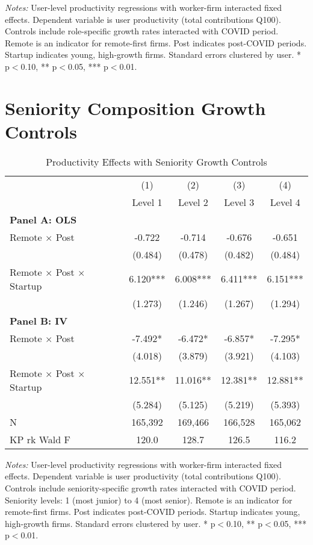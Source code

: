 \documentclass[11pt]{article}
\begin{document}
\noindent \footnotesize \textit{Notes:} User-level productivity regressions with worker-firm interacted fixed effects. Dependent variable is user productivity (total contributions Q100). Controls include role-specific growth rates interacted with COVID period. Remote is an indicator for remote-first firms. Post indicates post-COVID periods. Startup indicates young, high-growth firms. Standard errors clustered by user. * p$<$0.10, ** p$<$0.05, *** p$<$0.01.

\section{Seniority Composition Growth Controls}

\begin{table}[H]
\centering
\caption{Productivity Effects with Seniority Growth Controls}
\begin{tabular}{lcccc}
\toprule
 & (1) & (2) & (3) & (4) \\
 & Level 1 & Level 2 & Level 3 & Level 4 \\
\midrule
\multicolumn{5}{l}{\textbf{Panel A: OLS}} \\
\addlinespace
Remote $\times$ Post & -0.722 & -0.714 & -0.676 & -0.651 \\ & (0.484) & (0.478) & (0.482) & (0.484) \\
\addlinespace[0.5em]
Remote $\times$ Post $\times$ Startup & 6.120*** & 6.008*** & 6.411*** & 6.151*** \\ & (1.273) & (1.246) & (1.267) & (1.294) \\
\midrule
\multicolumn{5}{l}{\textbf{Panel B: IV}} \\
\addlinespace
Remote $\times$ Post & -7.492* & -6.472* & -6.857* & -7.295* \\ & (4.018) & (3.879) & (3.921) & (4.103) \\
\addlinespace[0.5em]
Remote $\times$ Post $\times$ Startup & 12.551** & 11.016** & 12.381** & 12.881** \\ & (5.284) & (5.125) & (5.219) & (5.393) \\
\midrule
N & 165,392 & 169,466 & 166,528 & 165,062 \\
KP rk Wald F & 120.0 & 128.7 & 126.5 & 116.2\\
\bottomrule
\end{tabular}
\end{table}

\noindent \footnotesize \textit{Notes:} User-level productivity regressions with worker-firm interacted fixed effects. Dependent variable is user productivity (total contributions Q100). Controls include seniority-specific growth rates interacted with COVID period. Seniority levels: 1 (most junior) to 4 (most senior). Remote is an indicator for remote-first firms. Post indicates post-COVID periods. Startup indicates young, high-growth firms. Standard errors clustered by user. * p$<$0.10, ** p$<$0.05, *** p$<$0.01.
\end{document}
